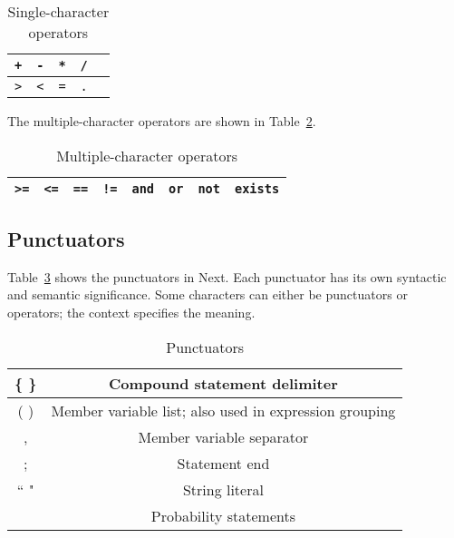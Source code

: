 \documentclass[12pt]{article}
\begin{document}
\begin{table}[htdp]
\caption{Single-character operators}
\begin{center}
\begin{tabular}{|c|c|c|c|c|}
\hline
\texttt{+} & \texttt{-} & \texttt{*} & \texttt{/}  \\
\hline
\texttt{>} & \texttt{<} & \texttt{=} & \texttt{.}  \\
\hline
\end{tabular}
\end{center}
\label{single_operators}
\end{table}%


\noindent The multiple-character operators are shown in Table~\ref{multi_operators}.

\begin{table}[htdp]
\caption{Multiple-character operators}
\begin{center}
\begin{tabular}{|c|c|c|c|c|c|c|c|}
\hline
\texttt{>=} & \texttt{<=} & \texttt{==} & \texttt{!=} & \texttt{and} & \texttt{or} & \texttt{not} & \texttt{exists}\\
\hline
\end{tabular}
\end{center}
\label{multi_operators}
\end{table}%

\subsection{Punctuators}
Table~\ref{punctuators} shows the punctuators in Next.  Each punctuator has its own syntactic and semantic significance.  Some characters can either be punctuators or operators; the context specifies the meaning.

\begin{table}[htdp]
\caption{Punctuators}
\begin{center}
\begin{tabular}{|c|c|}
\hline
\{ \} & Compound statement delimiter \\
\hline
( ) & Member variable list; also used in expression grouping \\
\hline
, & Member variable separator \\
\hline
; & Statement end \\
\hline 
`` " & String literal \\
\hline
[? ?] & Probability statements \\ 
\hline
\end{tabular}
\end{center}
\label{punctuators}
\end{table}%
\end{document}

